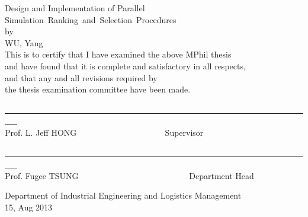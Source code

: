 \begin{center}
{\Large Design and Implementation of Parallel Simulation~Ranking~and~Selection~Procedures}\\
\vspace{23mm}
by\\
\vspace{3mm}
WU, Yang\\
\vspace{5mm}
This is to certify that I have examined the above MPhil thesis\\
and have found that it is complete and satisfactory in all respects,\\
and that any and all revisions required by\\
the thesis examination committee have been made.
\end{center}

\vspace{20mm}

\begin{center}
\underline{~~~~~~~~~~~~~~~~~~~~~~~~~~~~~~~~~~~~~~~~~~~~~~~~~~~~~~~~~~~~~~~~~~~~~~~~~~~ }\\
Prof. L. Jeff HONG ~~~~~~~~~~~~~~~~~~~~ Supervisor
\end{center}

\vspace{20mm}

\begin{center}
\underline{~~~~~~~~~~~~~~~~~~~~~~~~~~~~~~~~~~~~~~~~~~~~~~~~~~~~~~~~~~~~~~~~~~~~~~~~~~~ }\\
Prof. Fugee TSUNG ~~~~~~~~~~~~~~~~~~~~~~~~~~Department Head
\end{center}
\vspace{15mm}
\begin{center}
Department of Industrial Engineering and Logistics Management\\
\vspace{5mm} 15, Aug 2013
\end{center}
